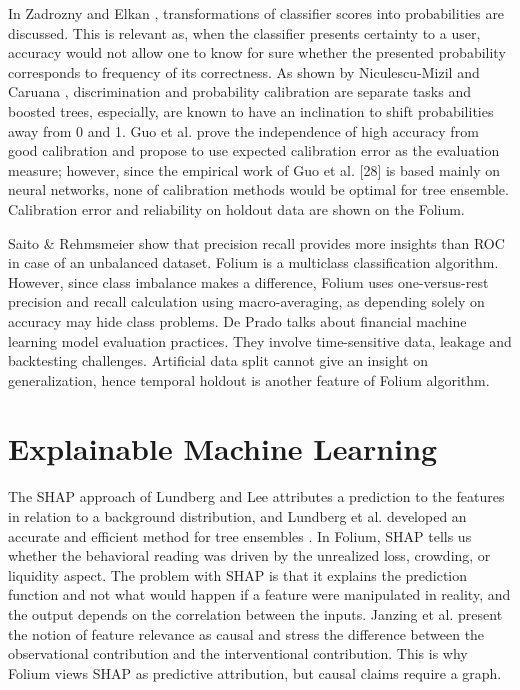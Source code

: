 In Zadrozny and Elkan \cite{b6}, transformations of classifier scores into probabilities are discussed. This is relevant as, when the classifier presents certainty to a user, accuracy would not allow one to know for sure whether the presented probability corresponds to frequency of its correctness. As shown by Niculescu-Mizil and Caruana \cite{b27}, discrimination and probability calibration are separate tasks and boosted trees, especially, are known to have an inclination to shift probabilities away from 0 and 1. Guo et al. \cite{b28} prove the independence of high accuracy from good calibration and propose to use expected calibration error as the evaluation measure; however, since the empirical work of Guo et al. [28] is based mainly on neural networks, none of calibration methods would be optimal for tree ensemble. Calibration error and reliability on holdout data are shown on the Folium.

Saito \& Rehmsmeier \cite{b29} show that precision recall provides more insights than ROC in case of an unbalanced dataset. Folium is a multiclass classification algorithm. However, since class imbalance makes a difference, Folium uses one-versus-rest precision and recall calculation using macro-averaging, as depending solely on accuracy may hide class problems. De Prado \cite{b24} talks about financial machine learning model evaluation practices. They involve time-sensitive data, leakage and backtesting challenges. Artificial data split cannot give an insight on generalization, hence temporal holdout is another feature of Folium algorithm.

\section{Explainable Machine Learning}
The SHAP approach of Lundberg and Lee \cite{b7} attributes a prediction to the features in relation to a background distribution, and Lundberg et al. developed an accurate and efficient method for tree ensembles \cite{b35}. In Folium, SHAP tells us whether the behavioral reading was driven by the unrealized loss, crowding, or liquidity aspect. The problem with SHAP is that it explains the prediction function and not what would happen if a feature were manipulated in reality, and the output depends on the correlation between the inputs. Janzing et al. \cite{b31} present the notion of feature relevance as causal and stress the difference between the observational contribution and the interventional contribution. This is why Folium views SHAP as predictive attribution, but causal claims require a graph.

